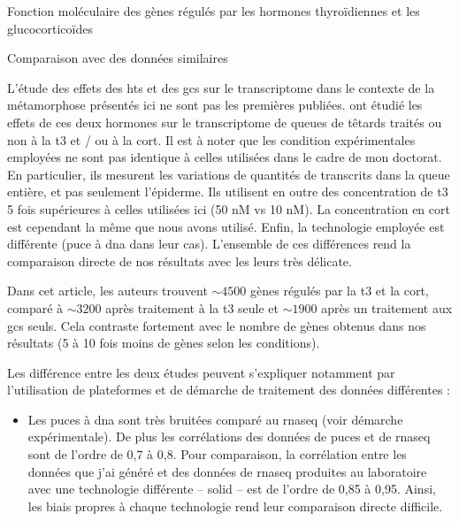 \documentclass[../main.tex]{subfiles}
\begin{document}
\begin{chapter}{Fonction moléculaire des gènes régulés par les hormones thyroïdiennes et les glucocorticoïdes}


\begin{section}{Comparaison avec des données similaires}

L'étude des effets des \glspl{ht} et des \glspl{gc} sur le transcriptome dans le contexte de la métamorphose présentés ici ne sont pas les premières publiées.
\citet{Kulkarni2012} ont étudié les effets de ces deux hormones sur le transcriptome de queues de têtards traités ou non à la \gls{t3} et / ou à la \gls{cort}.
Il est à noter que les condition expérimentales employées ne sont pas identique à celles utilisées dans le cadre de mon doctorat.
En particulier, ils mesurent les variations de quantités de transcrits dans la queue entière, et pas seulement l'épiderme.
Ils utilisent en outre des concentration de \gls{t3} 5 fois supérieures à celles utilisées ici (50 nM vs 10 nM).
La concentration en \gls{cort} est cependant la même que nous avons utilisé.
Enfin, la technologie employée est différente (puce à \gls{dna} dans leur cas).
L'ensemble de ces différences rend la comparaison directe de nos résultats avec les leurs très délicate.
\par
Dans cet article, les auteurs trouvent $\sim 4500$ gènes régulés par la \gls{t3} et la \gls{cort}, comparé à $\sim 3200$ après traitement à la \gls{t3} seule et $\sim 1900$ après un traitement aux \glspl{gc} seuls.
Cela contraste fortement avec le nombre de gènes obtenus dans nos résultats (5 à 10 fois moins de gènes selon les conditions).
\par
Les différence entre les deux études peuvent s'expliquer notamment par l'utilisation de plateformes et de démarche de traitement des données différentes :
\begin{itemize}
\item Les puces à \gls{dna} sont très bruitées comparé au \gls{rnaseq} (voir démarche expérimentale).
De plus les corrélations des données de puces et de \gls{rnaseq} sont de l'ordre de 0,7 à 0,8.
Pour comparaison, la corrélation entre les données que j'ai généré et des données de \gls{rnaseq} produites au laboratoire avec une technologie différente – \gls{solid} – est de l'ordre de 0,85 à 0,95.
Ainsi, les biais propres à chaque technologie rend leur comparaison directe difficile.

\end{itemize}
\end{section}
\end{chapter}
\end{document}
